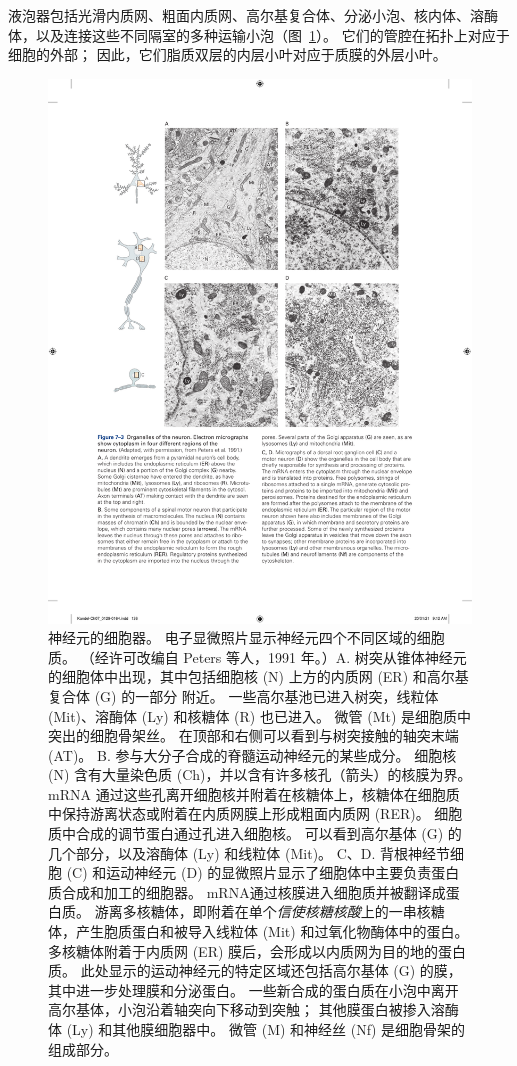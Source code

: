 液泡器包括光滑内质网、粗面内质网、高尔基复合体、分泌小泡、核内体、溶酶体，以及连接这些不同隔室的多种运输小泡（图~\ref{fig:7_3}）。
它们的管腔在拓扑上对应于细胞的外部；
因此，它们脂质双层的内层小叶对应于质膜的外层小叶。


\begin{figure}[htbp]
	\centering
	\includegraphics[width=1.0\linewidth]{chap07/fig_7_3}
	\caption{神经元的细胞器。 电子显微照片显示神经元四个不同区域的细胞质。 （经许可改编自 Peters 等人，1991 年。）A. 树突从锥体神经元的细胞体中出现，其中包括细胞核 (N) 上方的内质网 (ER) 和高尔基复合体 (G) 的一部分 附近。 一些高尔基池已进入树突，线粒体 (Mit)、溶酶体 (Ly) 和核糖体 (R) 也已进入。 微管 (Mt) 是细胞质中突出的细胞骨架丝。 在顶部和右侧可以看到与树突接触的轴突末端 (AT)。 B. 参与大分子合成的脊髓运动神经元的某些成分。 细胞核 (N) 含有大量染色质 (Ch)，并以含有许多核孔（箭头）的核膜为界。 mRNA 通过这些孔离开细胞核并附着在核糖体上，核糖体在细胞质中保持游离状态或附着在内质网膜上形成粗面内质网 (RER)。 细胞质中合成的调节蛋白通过孔进入细胞核。 可以看到高尔基体 (G) 的几个部分，以及溶酶体 (Ly) 和线粒体 (Mit)。 C、D. 背根神经节细胞 (C) 和运动神经元 (D) 的显微照片显示了细胞体中主要负责蛋白质合成和加工的细胞器。 mRNA通过核膜进入细胞质并被翻译成蛋白质。 游离多核糖体，即附着在单个\textit{信使核糖核酸}上的一串核糖体，产生胞质蛋白和被导入线粒体 (Mit) 和过氧化物酶体中的蛋白。 多核糖体附着于内质网 (ER) 膜后，会形成以内质网为目的地的蛋白质。 此处显示的运动神经元的特定区域还包括高尔基体 (G) 的膜，其中进一步处理膜和分泌蛋白。 一些新合成的蛋白质在小泡中离开高尔基体，小泡沿着轴突向下移动到突触； 其他膜蛋白被掺入溶酶体 (Ly) 和其他膜细胞器中。 微管 (M) 和神经丝 (Nf) 是细胞骨架的组成部分。}
	\label{fig:7_3}
\end{figure}


